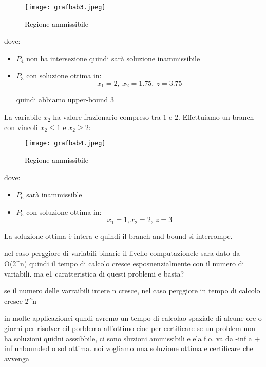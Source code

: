 \begin{figure}[H]
\centering
\texttt{[image: grafbab3.jpeg]}
\caption{Regione ammissibile} 
\label{grafbab3}
\end{figure}

dove:

\begin{itemize}
    \item $P_4$ non ha intersezione quindi sarà soluzione inammissibile
    \item $P_3$ con soluzione ottima in:
        $$x_1 = 2,\ x_2 = 1.75,\ z = 3.75$$
        
        quindi abbiamo upper-bound $3$
\end{itemize}

La variabile $x_2$ ha valore frazionario compreso tra $1$ e $2$. Effettuiamo un branch con vincoli $x_2 \leq 1$ e $x_2 \geq 2$:

\begin{figure}[H]
\centering
\texttt{[image: grafbab4.jpeg]}
\caption{Regione ammissibile} 
\label{grafbab4}
\end{figure}

dove:

\begin{itemize}
    \item $P_6$ sarà inammissible
    \item $P_5$ con soluzione ottima in:
        $$x_1 = 1, x_2 = 2,\ z = 3$$

\end{itemize}

La soluzione ottima è intera e quindi il branch and bound si interrompe.











nel caso perggiore di variabili binarie il livello computazionele sara dato da O(2^n) quindi il tempo di calcolo cresce esposnenzialmente con il numero di variabili. ma e1 caratteristica di questi problemi  e basta?

se il numero delle varraibili intere n cresce, nel caso perggiore in tempo di calcolo cresce 2^n

in molte applicazionei qundi avremo un tempo di calcolao spaziale di alcune ore o giorni per risolver eil porblema all’ottimo cioe per certificare se un problem non ha soluzioni quidni asssibbile, ci sono sluzioni ammissibili e ela f.o. va da -inf a + inf unbounded o sol ottima. noi vogliamo una soluzione ottima e certificare che avvenga

